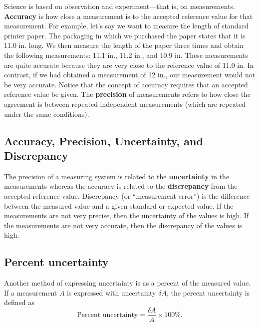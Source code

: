 \documentclass{report}
\begin{document}
    \pagebreak 
    \bigbreak \noindent 
    Science is based on observation and experiment—that is, on measurements. \textbf{Accuracy} is how close a measurement is to the accepted reference value for that measurement. For example, let’s say we want to measure the length of standard printer paper. The packaging in which we purchased the paper states that it is 11.0 in. long. We then measure the length of the paper three times and obtain the following measurements: 11.1 in., 11.2 in., and 10.9 in. These measurements are quite accurate because they are very close to the reference value of 11.0 in. In contrast, if we had obtained a measurement of 12 in., our measurement would not be very accurate. Notice that the concept of accuracy requires that an accepted reference value be given.
    \bigbreak \noindent 
    The \textbf{precision} of measurements refers to how close the agreement is between repeated independent measurements (which are repeated under the same conditions).
    \bigbreak \noindent 
    \subsection{Accuracy, Precision, Uncertainty, and Discrepancy}
    \bigbreak \noindent 
    The precision of a measuring system is related to the \textbf{uncertainty} in the measurements whereas the accuracy is related to the \textbf{discrepancy} from the accepted reference value.
    \bigbreak \noindent 
    Discrepancy (or “measurement error”) is the difference between the measured value and a given standard or expected value.
    \bigbreak \noindent If the measurements are not very precise, then the uncertainty of the values is high. If the measurements are not very accurate, then the discrepancy of the values is high.
    \bigbreak \noindent 
    \subsection{Percent uncertainty}
    \bigbreak \noindent 
    Another method of expressing uncertainty is as a percent of the measured value. If a measurement \( A \) is expressed with uncertainty \( \delta A \), the percent uncertainty is defined as
    \[
    \text{Percent uncertainty} = \frac{\delta A}{A} \times 100\%.
    \]
\end{document}
